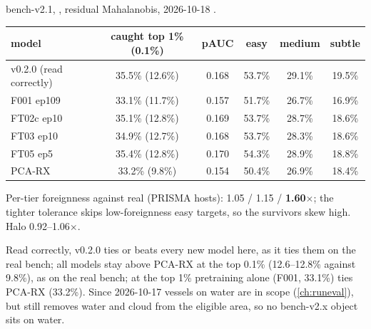 \begin{drift}
bench-v2.1, , residual Mahalanobis, 2026-10-18
\hfil{}\hfilneg{}.
\begin{center}
\small
\begin{tabular}{lccccc}
\toprule
model & caught top 1\% (0.1\%) & pAUC & easy & medium & subtle \\
\midrule
v0.2.0 (read correctly) & 35.5\% (12.6\%) & 0.168 & 53.7\% & 29.1\% & 19.5\% \\
F001 ep109 & 33.1\% (11.7\%) & 0.157 & 51.7\% & 26.7\% & 16.9\% \\
FT02c ep10 & 35.1\% (12.8\%) & 0.169 & 53.7\% & 28.7\% & 18.6\% \\
FT03 ep10 & 34.9\% (12.7\%) & 0.168 & 53.7\% & 28.3\% & 18.6\% \\
FT05 ep5 & 35.4\% (12.8\%) & 0.170 & 54.3\% & 28.9\% & 18.8\% \\
PCA-RX & 33.2\% (9.8\%) & 0.154 & 50.4\% & 26.9\% & 18.4\% \\
\bottomrule
\end{tabular}
\end{center}
Per-tier foreignness against real (PRISMA hosts): 1.05 / 1.15 / \textbf{1.60}$\times$; the tighter tolerance skips
low-foreignness easy targets, so the survivors skew high. Halo 0.92--1.06$\times$.
\end{drift}

Read correctly, v0.2.0 ties or beats every new model here, as it ties them on the real bench; all models stay above
PCA-RX at the top 0.1\% (12.6--12.8\% against 9.8\%), as on the real bench; at the top 1\% pretraining alone (F001,
33.1\%) ties PCA-RX (33.2\%). Since 2026-10-17 vessels on water are in scope (\cref{ch:runeval}), but
 still removes water and cloud from the eligible area, so no bench-v2.x object sits on water.

